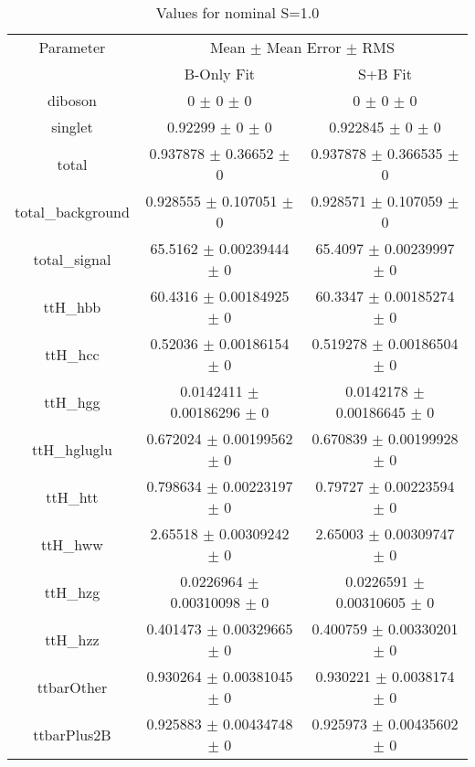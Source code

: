 \begin{table}
\centering
\caption{Values for nominal S=1.0}
\begin{tabular}{ccc}
\toprule
Parameter & \multicolumn{2}{c}{Mean $\pm$ Mean Error $\pm$ RMS}\\
 & B-Only Fit & S+B Fit\\
\midrule
diboson & \num{0} $\pm$ \num{0} $\pm$ \num{0} & \num{0} $\pm$ \num{0} $\pm$ \num{0}\\
singlet & \num{0.92299} $\pm$ \num{0} $\pm$ \num{0} & \num{0.922845} $\pm$ \num{0} $\pm$ \num{0}\\
total & \num{0.937878} $\pm$ \num{0.36652} $\pm$ \num{0} & \num{0.937878} $\pm$ \num{0.366535} $\pm$ \num{0}\\
total\_background & \num{0.928555} $\pm$ \num{0.107051} $\pm$ \num{0} & \num{0.928571} $\pm$ \num{0.107059} $\pm$ \num{0}\\
total\_signal & \num{65.5162} $\pm$ \num{0.00239444} $\pm$ \num{0} & \num{65.4097} $\pm$ \num{0.00239997} $\pm$ \num{0}\\
ttH\_hbb & \num{60.4316} $\pm$ \num{0.00184925} $\pm$ \num{0} & \num{60.3347} $\pm$ \num{0.00185274} $\pm$ \num{0}\\
ttH\_hcc & \num{0.52036} $\pm$ \num{0.00186154} $\pm$ \num{0} & \num{0.519278} $\pm$ \num{0.00186504} $\pm$ \num{0}\\
ttH\_hgg & \num{0.0142411} $\pm$ \num{0.00186296} $\pm$ \num{0} & \num{0.0142178} $\pm$ \num{0.00186645} $\pm$ \num{0}\\
ttH\_hgluglu & \num{0.672024} $\pm$ \num{0.00199562} $\pm$ \num{0} & \num{0.670839} $\pm$ \num{0.00199928} $\pm$ \num{0}\\
ttH\_htt & \num{0.798634} $\pm$ \num{0.00223197} $\pm$ \num{0} & \num{0.79727} $\pm$ \num{0.00223594} $\pm$ \num{0}\\
ttH\_hww & \num{2.65518} $\pm$ \num{0.00309242} $\pm$ \num{0} & \num{2.65003} $\pm$ \num{0.00309747} $\pm$ \num{0}\\
ttH\_hzg & \num{0.0226964} $\pm$ \num{0.00310098} $\pm$ \num{0} & \num{0.0226591} $\pm$ \num{0.00310605} $\pm$ \num{0}\\
ttH\_hzz & \num{0.401473} $\pm$ \num{0.00329665} $\pm$ \num{0} & \num{0.400759} $\pm$ \num{0.00330201} $\pm$ \num{0}\\
ttbarOther & \num{0.930264} $\pm$ \num{0.00381045} $\pm$ \num{0} & \num{0.930221} $\pm$ \num{0.0038174} $\pm$ \num{0}\\
ttbarPlus2B & \num{0.925883} $\pm$ \num{0.00434748} $\pm$ \num{0} & \num{0.925973} $\pm$ \num{0.00435602} $\pm$ \num{0}\\

\end{tabular}
\end{table}

